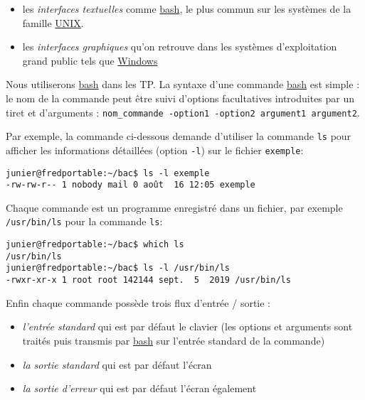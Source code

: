 \documentclass[
  11pt,
]{article}
\providecommand{\tightlist}{%
  \setlength{\itemsep}{0pt}\setlength{\parskip}{0pt}}
\newcounter{prog}
\begin{document}
\begin{itemize}
\tightlist
\item
  les \emph{interfaces textuelles} comme
  \href{https://fr.wikipedia.org/wiki/Bourne-Again_shell}{bash}, le plus
  commun sur les systèmes de la famille
  \href{https://fr.wikipedia.org/wiki/Bourne-Again_shell}{UNIX}.
\item
  les \emph{interfaces graphiques} qu'on retrouve dans les systèmes
  d'exploitation grand public tels que
  \href{https://fr.wikipedia.org/wiki/Microsoft_Windows}{Windows}
\end{itemize}

Nous utiliserons
\href{https://fr.wikipedia.org/wiki/Bourne-Again_shell}{bash} dans les
TP. La syntaxe d'une commande
\href{https://fr.wikipedia.org/wiki/Bourne-Again_shell}{bash} est simple
: le nom de la commande peut être suivi d'options facultatives
introduites par un tiret et d'arguments :
\texttt{nom\_commande\ -option1\ -option2\ argument1\ argument2}.

Par exemple, la commande ci-dessous demande d'utiliser la commande
\texttt{ls} pour afficher les informations détaillées (option
\texttt{-l}) sur le fichier \texttt{exemple}:

\begin{verbatim}
junier@fredportable:~/bac$ ls -l exemple
-rw-rw-r-- 1 nobody mail 0 août  16 12:05 exemple
\end{verbatim}

Chaque commande est un programme enregistré dans un fichier, par exemple
\texttt{/usr/bin/ls} pour la commande \texttt{ls}:

\begin{verbatim}
junier@fredportable:~/bac$ which ls
/usr/bin/ls
junier@fredportable:~/bac$ ls -l /usr/bin/ls
-rwxr-xr-x 1 root root 142144 sept.  5  2019 /usr/bin/ls
\end{verbatim}

Enfin chaque commande possède trois flux d'entrée / sortie :

\begin{itemize}
\tightlist
\item
  \emph{l'entrée standard} qui est par défaut le clavier (les options et
  arguments sont traités puis transmis par
  \href{https://fr.wikipedia.org/wiki/Bourne-Again_shell}{bash} sur
  l'entrée standard de la commande)
\item
  \emph{la sortie standard} qui est par défaut l'écran
\item
  \emph{la sortie d'erreur} qui est par défaut l'écran également
\end{itemize}
\end{document}
